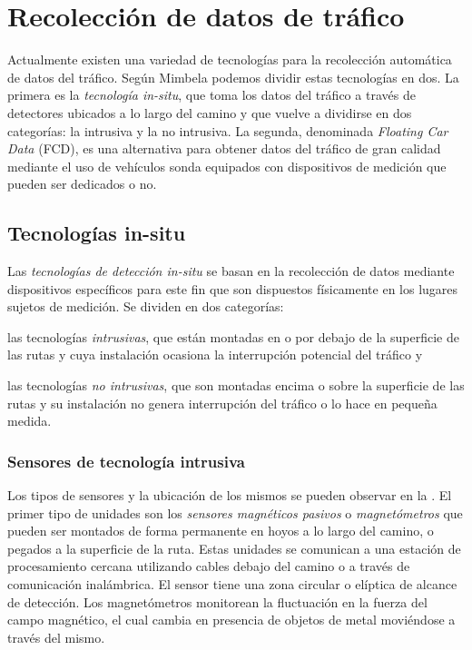 \chapter{Recolección de datos de tráfico}
\label{cap:3}

Actualmente existen una variedad de tecnologías para la recolección automática de datos del tráfico. Según Mimbela \cite{mimbela2003summary} podemos dividir estas tecnologías en dos. La primera es la \emph{tecnología in-situ}, que toma los datos del tráfico a través de detectores ubicados a lo largo del camino y que vuelve a dividirse en dos categorías: la intrusiva y la no intrusiva. La segunda, denominada \emph{Floating Car Data} (FCD), es una alternativa para obtener datos del tráfico de gran calidad mediante el uso de vehículos sonda equipados con dispositivos de medición que pueden ser dedicados o no.

\section{Tecnologías in-situ}

Las \emph{tecnologías de detección in-situ} se basan en la recolección de datos mediante dispositivos específicos para este fin que son dispuestos físicamente en los lugares sujetos de medición. Se dividen en dos categorías: \begin{enumerate*}[a)] \item las tecnologías \emph{intrusivas}, que están montadas en o por debajo de la superficie de las rutas y cuya instalación ocasiona la interrupción potencial del tráfico y \item las tecnologías \emph{no intrusivas}, que son montadas encima o sobre la superficie de las rutas y su instalación no genera interrupción del tráfico o lo hace en pequeña medida.\end{enumerate*}

\subsection{Sensores de tecnología intrusiva}

Los tipos de sensores y la ubicación de los mismos se pueden observar en la . El primer tipo de unidades son los \emph{sensores magnéticos pasivos} o  \emph{magnetómetros} que pueden ser montados de forma permanente en hoyos a lo largo del camino, o pegados a la superficie de la ruta. Estas unidades se comunican a una estación de procesamiento cercana utilizando cables debajo del camino o a través de comunicación inalámbrica. El sensor tiene una zona circular o elíptica de alcance de detección. Los magnetómetros monitorean la fluctuación en la fuerza del campo magnético, el cual cambia en presencia de objetos de metal moviéndose a través del mismo.

